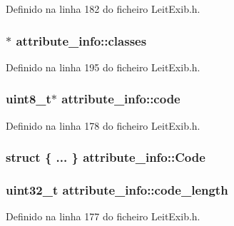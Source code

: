 Definido na linha 182 do ficheiro Leit\-Exib.\-h.

\hypertarget{structattribute__info_a65d85b8eb6a1f28360c9795ed98de13c}{
\subsubsection[{classes}]{$\ast$ attribute\-\_\-info\-::classes}}\label{structattribute__info_a65d85b8eb6a1f28360c9795ed98de13c}


Definido na linha 195 do ficheiro Leit\-Exib.\-h.

\hypertarget{structattribute__info_a15eebcb51490097313095ed5634767da}{
\subsubsection[{code}]{\setlength{\rightskip}{0pt plus 5cm}uint8\-\_\-t$\ast$ attribute\-\_\-info\-::code}}\label{structattribute__info_a15eebcb51490097313095ed5634767da}


Definido na linha 178 do ficheiro Leit\-Exib.\-h.

\hypertarget{structattribute__info_a28164548bd28ed935b9e04966dac6651}{
\subsubsection[{Code}]{\setlength{\rightskip}{0pt plus 5cm}struct \{ ... \}   attribute\-\_\-info\-::\-Code}}\label{structattribute__info_a28164548bd28ed935b9e04966dac6651}
\hypertarget{structattribute__info_afd6f0e0a9a7bac7c8c2173b5b278b329}{
\subsubsection[{code\-\_\-length}]{\setlength{\rightskip}{0pt plus 5cm}uint32\-\_\-t attribute\-\_\-info\-::code\-\_\-length}}\label{structattribute__info_afd6f0e0a9a7bac7c8c2173b5b278b329}


Definido na linha 177 do ficheiro Leit\-Exib.\-h.

